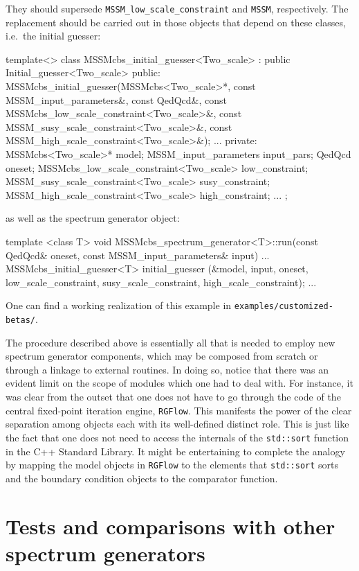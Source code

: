 \documentclass[final,3p,11pt,pdflatex]{elsarticle}
\newcommand{\code}[1]{\lstinline|#1|}  %
\begin{document}
They should supersede
\code{MSSM_low_scale_constraint} and \code{MSSM}, respectively.
The replacement should be carried out in
those objects that depend on these classes,
i.e.\ the initial guesser:
\begin{numlstlisting}
template<>
class MSSMcbs_initial_guesser<Two_scale> : public Initial_guesser<Two_scale> {
public:
  MSSMcbs_initial_guesser(MSSMcbs<Two_scale>*,
                          const MSSM_input_parameters&,
                          const QedQcd&,
                          const MSSMcbs_low_scale_constraint<Two_scale>&,
                          const MSSM_susy_scale_constraint<Two_scale>&,
                          const MSSM_high_scale_constraint<Two_scale>&);
  ...
private:
  MSSMcbs<Two_scale>* model;
  MSSM_input_parameters input_pars;
  QedQcd oneset;
  MSSMcbs_low_scale_constraint<Two_scale> low_constraint;
  MSSM_susy_scale_constraint<Two_scale> susy_constraint;
  MSSM_high_scale_constraint<Two_scale> high_constraint;
  ...
};
\end{numlstlisting}
as well as the spectrum generator object:
\begin{numlstlisting}
template <class T>
void MSSMcbs_spectrum_generator<T>::run(const QedQcd& oneset,
					const MSSM_input_parameters& input)
{
  ...
  MSSMcbs_initial_guesser<T> initial_guesser
    (&model, input, oneset,
     low_scale_constraint, susy_scale_constraint, high_scale_constraint);
  ...
}
\end{numlstlisting}
One can find a working realization of this example
in \code{examples/customized-betas/}.

The procedure described above is essentially all that is needed
to employ new spectrum generator components,
which may be composed from scratch or through
a linkage to external routines.
In doing so,
notice that there was an evident limit on the scope of
modules which one had to deal with.
For instance, it was clear from the outset
that one does not have to go through the code of the central
fixed-point iteration engine, \code{RGFlow}.
This manifests the power of the clear separation among objects
each with its well-defined distinct role.
This is just like the fact that one does not need to access the internals
of the \code{std::sort} function in the C++ Standard Library.
It might be entertaining to complete the analogy by
mapping the model objects in \code{RGFlow}
to the elements that \code{std::sort} sorts
and the boundary condition objects
to the comparator function.

\section{Tests and comparisons with other spectrum generators}
\label{sec:comparison}
\end{document}
